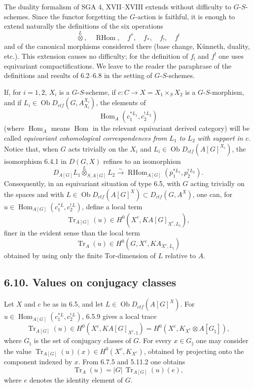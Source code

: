 \documentclass[11pt]{article}
\theoremstyle{plain}
\theoremstyle{definition}
\theoremstyle{remark}
\DeclareMathOperator{\Hom}{Hom}
\DeclareMathOperator{\ob}{Ob}
\DeclareMathOperator{\Tr}{Tr}
\DeclareMathOperator{\RHom}{RHom}
\begin{document}
The duality formalism of SGA 4, XVII--XVIII extends without difficulty to
$G$-$S$-schemes. Since the functor forgetting the $G$-action is faithful, it is enough
to extend naturally the definitions of the six operations
\[
   \overset{L}{\otimes},\quad \RHom,\quad f^*,\quad f_*,\quad f_!,\quad f^!
\]
and of the canonical morphisms considered there (base change, Künneth, duality,
etc.). This extension causes no difficulty; for the definition of $f_!$ and $f^!$ one
uses equivariant compactifications. We leave to the reader the paraphrase of the
definitions and results of 6.2--6.8 in the setting of $G$-$S$-schemes.

If, for $i=1,2$, $X_i$ is a $G$-$S$-scheme, if
$c:C\to X=X_1\times_S X_2$ is a $G$-$S$-morphism, and if
$L_i\in\ob D_{ctf}(G,A_{X_i}^{X_i})$, the elements of
\[
     \Hom_A(c_1^{*L_1},c_2^{!\,L_2})
\]
(where $\Hom_A$ means $\Hom$ in the relevant equivariant derived category) will be
called \emph{equivariant cohomological correspondences from $L_1$ to $L_2$ with
support in $c$}. Notice that, when $G$ acts trivially on the $X_i$ and
$L_i\in\ob D_{ctf}(A[G]^{X_i})$, the isomorphism 6.4.1 in $D(G,X)$ refines to
an isomorphism
\[
D_{A[G]}L_1\overset{L}{\otimes}_{S,A[G]}L_2
\xrightarrow{\sim}
\RHom_{A[G]}(p_1^{*L_1},p_2^{!\,L_2}).
\]
Consequently, in an equivariant situation of type 6.5, with $G$ acting trivially on
the spaces and with $L\in\ob D_{ctf}(A[G]^X)\subset D_{ctf}(G,A^X)$, one can, for
$u\in\Hom_{A[G]}(c_1^{*L},c_2^{!\,L})$, define a local term
\[
     \Tr_{A[G]}(u)\in H^0(X^c,K A[G]_{X^c,L_\natural}),
\]
finer in the evident sense than the local term
\[
     \Tr_A(u)\in H^0(G,X^c,K A_{X^c,L_\natural})
\]
obtained by using only the finite Tor-dimension of $L$ relative to $A$.

\subsection*{6.10. Values on conjugacy classes}

Let $X$ and $c$ be as in 6.5, and let $L\in\ob D_{ctf}(A[G]^X)$. For
$u\in\Hom_{A[G]}(c_1^{*L},c_2^{!\,L})$, 6.5.9 gives a local trace
\begin{equation}\tag{6.10.1}
\Tr_{A[G]}(u)\in H^0(X^c,K A[G]_{X^c,\natural})
 = H^0(X^c,K_{X^c}\otimes A[G_\natural]),
\end{equation}
where $G_\natural$ is the set of conjugacy classes of $G$. For every
$x\in G_\natural$ one may consider the value
$\Tr_{A[G]}(u)(x)\in H^0(X^c,K_{X^c})$, obtained by projecting onto the component
indexed by $x$. From 6.7.5 and 5.11.2 one obtains
\begin{equation}\tag{6.10.2}
    \Tr_A(u)=|G|\,\Tr_{A[G]}(u)(e),
\end{equation}
where $e$ denotes the identity element of $G$.
\end{document}
